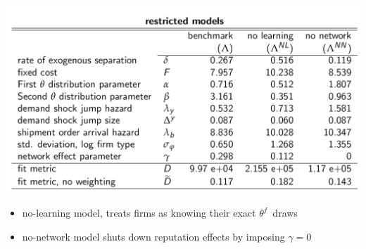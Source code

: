 \documentclass[notes=show]{beamer}
\begin{document}
\begin{frame}%



\includegraphics[scale=0.27]{figs/restricted.png}

\begin{itemize}
\item {\small no-learning model, treats firms as knowing their exact }$%
\theta ^{f}${\small \ draws}

\item {\small no-network model shuts down reputation effects by imposing }$%
\gamma =0$
\end{itemize}

\end{frame}%
\end{document}
